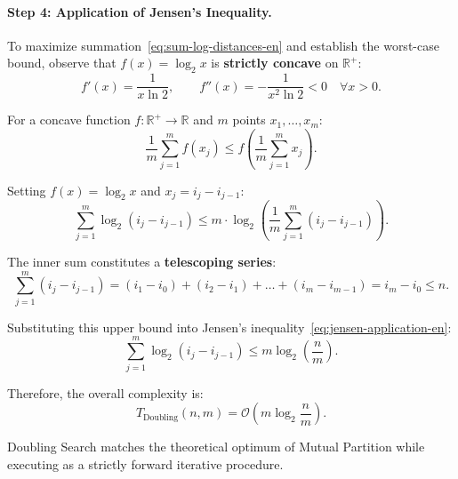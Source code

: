 \paragraph{Step 4: Application of Jensen's Inequality.}
To maximize summation~\eqref{eq:sum-log-distances-en} and establish the worst-case bound, observe that $f(x) = \log_2 x$ is \textbf{strictly concave} on $\mathbb{R}^+$:
\begin{equation}
  f'(x) = \frac{1}{x \ln 2}, \qquad f''(x) = -\frac{1}{x^2 \ln 2} < 0 \quad \forall x > 0.
\end{equation}

\begin{theorem}
For a concave function $f: \mathbb{R}^+ \to \mathbb{R}$ and $m$ points $x_1, \dots, x_m$:
\begin{equation}
  \frac{1}{m} \sum_{j=1}^m f(x_j) \le f\left(\frac{1}{m} \sum_{j=1}^m x_j\right).
\end{equation}
\end{theorem}

Setting $f(x) = \log_2 x$ and $x_j = i_j - i_{j-1}$:
\begin{equation}
  \sum_{j=1}^m \log_2(i_j - i_{j-1}) \le m \cdot \log_2\left(\frac{1}{m} \sum_{j=1}^m (i_j - i_{j-1})\right).
  \label{eq:jensen-application-en}
\end{equation}

The inner sum constitutes a \textbf{telescoping series}:
\begin{equation}
  \sum_{j=1}^m (i_j - i_{j-1}) = (i_1 - i_0) + (i_2 - i_1) + \dots + (i_m - i_{m-1}) = i_m - i_0 \le n.
\end{equation}

Substituting this upper bound into Jensen's inequality~\eqref{eq:jensen-application-en}:
\begin{equation}
  \sum_{j=1}^m \log_2(i_j - i_{j-1}) \le m \log_2\left(\frac{n}{m}\right).
\end{equation}

Therefore, the overall complexity is:
\begin{equation}
  T_{\text{Doubling}}(n, m) = \mathcal{O}\left(m \log_2 \frac{n}{m}\right).
\end{equation}

Doubling Search matches the theoretical optimum of Mutual Partition while executing as a strictly forward iterative procedure.

